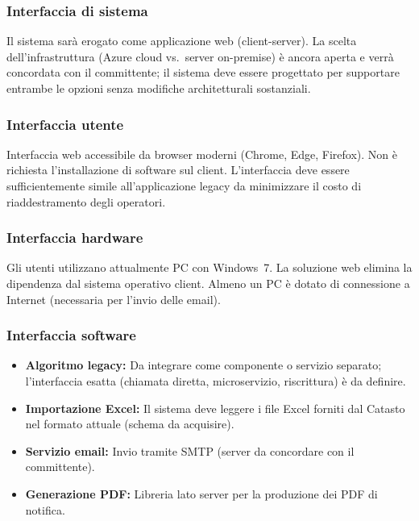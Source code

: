 \documentclass[12pt, a4paper]{article}
\begin{document}
\subsubsection{Interfaccia di sistema}

Il sistema sarà erogato come applicazione web (client-server). La scelta dell'infrastruttura
(Azure cloud vs.\ server on-premise) è ancora aperta e verrà concordata con il committente;
il sistema deve essere progettato per supportare entrambe le opzioni senza modifiche
architetturali sostanziali.

\subsubsection{Interfaccia utente}

Interfaccia web accessibile da browser moderni (Chrome, Edge, Firefox). Non è richiesta
l'installazione di software sul client. L'interfaccia deve essere sufficientemente simile
all'applicazione legacy da minimizzare il costo di riaddestramento degli operatori.

\subsubsection{Interfaccia hardware}

Gli utenti utilizzano attualmente PC con Windows~7. La soluzione web elimina la dipendenza
dal sistema operativo client. Almeno un PC è dotato di connessione a Internet (necessaria
per l'invio delle email).

\subsubsection{Interfaccia software}

\begin{itemize}
  \item \textbf{Algoritmo legacy:} Da integrare come componente o servizio separato;
        l'interfaccia esatta (chiamata diretta, microservizio, riscrittura) è da definire.
  \item \textbf{Importazione Excel:} Il sistema deve leggere i file Excel forniti dal Catasto
        nel formato attuale (schema da acquisire).
  \item \textbf{Servizio email:} Invio tramite SMTP (server da concordare con il committente).
  \item \textbf{Generazione PDF:} Libreria lato server per la produzione dei PDF di notifica.
\end{itemize}
\end{document}
